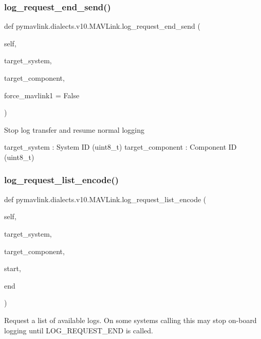 \begin{DoxyVerb}
\begin{DoxyVerb}
\begin{DoxyVerb}
\begin{DoxyVerb}
\subsubsection{\texorpdfstring{log\+\_\+request\+\_\+end\+\_\+send()}{log\_request\_end\_send()}}
{\footnotesize\ttfamily def pymavlink.\+dialects.\+v10.\+M\+A\+V\+Link.\+log\+\_\+request\+\_\+end\+\_\+send (\begin{DoxyParamCaption}\item[{}]{self,  }\item[{}]{target\+\_\+system,  }\item[{}]{target\+\_\+component,  }\item[{}]{force\+\_\+mavlink1 = {\ttfamily False} }\end{DoxyParamCaption})}

\begin{DoxyVerb}Stop log transfer and resume normal logging

target_system             : System ID (uint8_t)
target_component          : Component ID (uint8_t)\end{DoxyVerb}
 \mbox{\label{classpymavlink_1_1dialects_1_1v10_1_1MAVLink_ac995ae19b2768eaa61bb3735eabb122b}} 
\subsubsection{\texorpdfstring{log\+\_\+request\+\_\+list\+\_\+encode()}{log\_request\_list\_encode()}}
{\footnotesize\ttfamily def pymavlink.\+dialects.\+v10.\+M\+A\+V\+Link.\+log\+\_\+request\+\_\+list\+\_\+encode (\begin{DoxyParamCaption}\item[{}]{self,  }\item[{}]{target\+\_\+system,  }\item[{}]{target\+\_\+component,  }\item[{}]{start,  }\item[{}]{end }\end{DoxyParamCaption})}

\begin{DoxyVerb}Request a list of available logs. On some systems calling this may
stop on-board logging until LOG_REQUEST_END is called.


\end{DoxyVerb}
\end{DoxyVerb}
\end{DoxyVerb}
\end{DoxyVerb}
\end{DoxyVerb}
